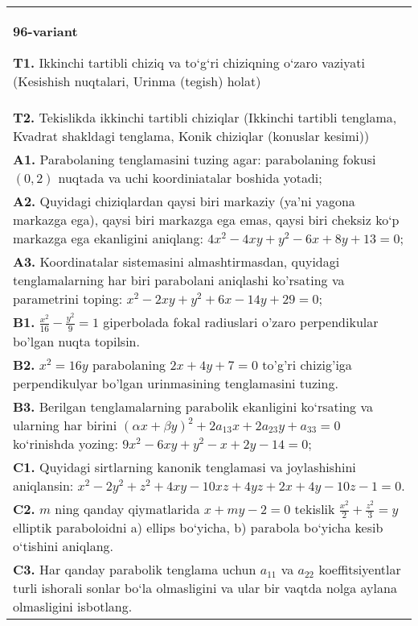 \documentclass{article}
\begin{document}
\begin{tabular}{m{17cm}}
\textbf{96-variant}
\newline

\textbf{T1.} Ikkinchi tartibli chiziq va to‘g‘ri chiziqning o‘zaro vaziyati (Kesishish nuqtalari, Urinma (tegish) holat) \\
\textbf{T2.} Tekislikda ikkinchi tartibli chiziqlar (Ikkinchi tartibli tenglama, Kvadrat shakldagi tenglama, Konik chiziqlar (konuslar kesimi)) \\
\textbf{A1.} Parabolaning tenglamasini tuzing agar: parabolaning fokusi $(0,2)$ nuqtada va uchi koordiniatalar boshida yotadi; \\
\textbf{A2.} Quyidagi chiziqlardan qaysi biri markaziy (ya’ni yagona markazga ega), qaysi biri markazga ega emas, qaysi biri cheksiz ko‘p markazga ega ekanligini aniqlang: $4 x^2-4 x y+y^2-6 x+8 y+13=0$; \\
\textbf{A3.} Koordinatalar sistemasini almashtirmasdan, quyidagi tenglamalarning har biri parabolani aniqlashi ko'rsating va parametrini toping: $x^2-2 x y+y^2+6 x-14 y+29=0$; \\
\textbf{B1.} $\frac{x^2}{16}-\frac{y^2}{9}=1$ giperbolada fokal radiuslari o'zaro perpendikular bo'lgan nuqta topilsin. \\
\textbf{B2.} $x^2=16y$ parabolaning $2x+4y+7=0$ to'g'ri chizig'iga perpendikulyar bo'lgan urinmasining tenglamasini tuzing. \\
\textbf{B3.} Berilgan tenglamalarning parabolik ekanligini ko‘rsating va ularning har birini $(\alpha x+\beta y)^2+2 a_{13} x+2 a_{23} y+a_{33}=0$ ko‘rinishda yozing: $9 x^2-6 x y+y^2-x+2 y-14=0$; \\
\textbf{C1.} Quyidagi sirtlarning kanonik tenglamasi va joylashishini aniqlansin: $x^2-2 y^2+z^2+4 x y-10 x z+4 y z+2 x+4 y-10 z-1=0$. \\
\textbf{C2.} $m$ ning qanday qiymatlarida $x+m y-2=0$ tekislik $\frac{x^2}{2}+\frac{z^2}{3}=y$ elliptik paraboloidni a) ellips bo‘yicha, b) parabola bo‘yicha kesib o‘tishini aniqlang. \\
\textbf{C3.} Har qanday parabolik tenglama uchun $a_{11}$ va $a_{22}$ koeffitsiyentlar turli ishorali sonlar bo‘la olmasligini va ular bir vaqtda nolga aylana olmasligini isbotlang. \\

\end{tabular}
\vspace{1cm}
\end{document}
